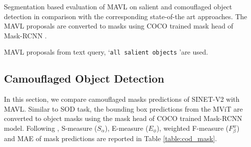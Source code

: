 \documentclass[runningheads]{llncs}
\newcommand{\txt}[1]{{\texttt{#1}}}
\begin{document}
\begin{table}[!h]
\caption{Segmentation based evaluation of MAVL on salient and comouflaged object detection in comparison with the corresponding state-of-the art approaches. The MAVL proposals are converted to masks using COCO \cite{coco} trained mask head of Mask-RCNN \cite{he2017mask}.}
\setlength\tabcolsep{4pt}
    \begin{subtable}[t]{0.49\linewidth}
        \caption{\small 
        MAVL proposals from text query, \lq \txt{all salient objects} \rq are used.
        }
        \label{table:sod_mask}
    \end{subtable}
    \begin{subtable}[t]{0.49\linewidth}
        \caption{\small 
        MAVL proposals generated using \lq \txt{all camouflaged objects}\rq~query are used.
        }
        \label{table:cod_mask}
    \end{subtable}
\end{table}

\subsection{Camouflaged Object Detection}\label{app:add_results_cod}
In this section, we compare camouflaged masks predictions of SINET-V2 \cite{SINET-V2} with MAVL. Similar to SOD task, the bounding box predictions from the MViT are converted to object masks using the mask head of COCO \cite{coco} trained Mask-RCNN \cite{he2017mask} model. Following \cite{fan2020camouflaged}, S-measure ($S_\alpha$), E-measure ($E_\phi$), weighted F-measure ($F_\beta^w$) and MAE of mask predictions are reported in Table \ref{table:cod_mask}.
\end{document}
